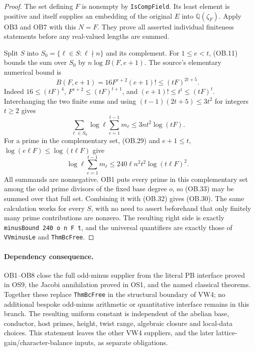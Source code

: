 \begin{proof}
The set defining $F$ is nonempty by \texttt{IsCompField}.  Its
least element is positive and itself supplies an embedding of the
original $E$ into $\mathbb Q(\zeta_F)$.  Apply OB3 and OB7 with
this $N=F$.  They prove all asserted individual finiteness
statements before any real-valued lengths are summed.

Split $S$ into $S_0=\{\ell\in S:\ell\nmid n\}$ and its complement.
For $1\le e<t$, (OB.11) bounds the sum over $S_0$ by
$n\log B(F,e+1)$.  The source's elementary numerical bound is
\[
        B(F,e+1)=16F^{e+2}(e+1)!
                       \le(tF)^{2t+5}.              \tag{OB.31}
\]
Indeed $16\le(tF)^4$, $F^{e+2}\le(tF)^{t+1}$, and
$(e+1)!\le t^t\le(tF)^t$.  Interchanging the two finite sums and
using $(t-1)(2t+5)\le3t^2$ for integers $t\ge2$ gives
\[
       \sum_{\ell\in S_0}\log\ell
                    \sum_{e=1}^{t-1}m_\ell
                        \le3nt^2\log(tF).           \tag{OB.32}
\]
For a prime in the complementary set, (OB.29) and
$e+1\le t$, $\log(e\ell F)\le\log(t\ell F)$ give
\[
      \log\ell\sum_{e=1}^{t-1}m_\ell
              \le240\ell n^2t^2\log(t\ell F)^2.
 \tag{OB.33}
\]
All summands are nonnegative.  OB1 puts every prime in this
complementary set among the odd prime divisors of the fixed
base degree $o$, so (OB.33) may be summed over that full set.
Combining it with (OB.32) gives (OB.30).  The same calculation works
for every $S$, with no need to assert beforehand that only finitely
many prime contributions are nonzero.  The resulting right side
is exactly \texttt{minusBound 240 o n F t}, and the universal
quantifiers are exactly those of \texttt{VVminusLe} and
\texttt{ThmBcFree}.
\end{proof}

\paragraph{Dependency consequence.}
OB1--OB8 close the full odd-minus supplier from the literal PB
interface proved in OS9, the Jacobi annihilation proved in OS1,
and the named classical theorems.  Together these replace
\texttt{ThmBcFree} in the structural boundary of VW4; no additional
bespoke odd-minus arithmetic or quantitative interface remains
in this branch.  The resulting uniform
constant is independent of the abelian base, conductor, host primes,
height, twist range, algebraic closure and local-data choices.
This statement leaves the other VW4 suppliers, and the later
lattice-gain/character-balance inputs, as separate obligations.
